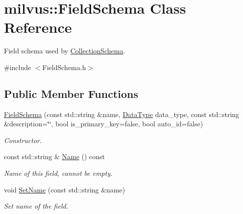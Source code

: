 \hypertarget{classmilvus_1_1_field_schema}{}\section{milvus\+:\+:Field\+Schema Class Reference}
\label{classmilvus_1_1_field_schema}


Field schema used by \hyperlink{classmilvus_1_1_collection_schema}{Collection\+Schema}.  




{\ttfamily \#include $<$Field\+Schema.\+h$>$}

\subsection*{Public Member Functions}
\begin{DoxyCompactItemize}
\item 
\mbox{\label{classmilvus_1_1_field_schema_ad626ad325c05abf8e8c020d1564c82aa}} 
\hyperlink{classmilvus_1_1_field_schema_ad626ad325c05abf8e8c020d1564c82aa}{Field\+Schema} (const std\+::string \&name, \hyperlink{namespacemilvus_a3bdf02cc09dcb59a1e1d2f287d90788b}{Data\+Type} data\+\_\+type, const std\+::string \&description=\char`\"{}\char`\"{}, bool is\+\_\+primary\+\_\+key=false, bool auto\+\_\+id=false)
\begin{DoxyCompactList}\small\item\em Constructor. \end{DoxyCompactList}\item 
\mbox{\label{classmilvus_1_1_field_schema_a8224147697c1416a8e80157224a9cc2a}} 
const std\+::string \& \hyperlink{classmilvus_1_1_field_schema_a8224147697c1416a8e80157224a9cc2a}{Name} () const
\begin{DoxyCompactList}\small\item\em Name of this field, cannot be empty. \end{DoxyCompactList}\item 
\mbox{\label{classmilvus_1_1_field_schema_a268b44271a055039710e3a50c87903bb}} 
void \hyperlink{classmilvus_1_1_field_schema_a268b44271a055039710e3a50c87903bb}{Set\+Name} (const std\+::string \&name)
\begin{DoxyCompactList}\small\item\em Set name of the field. \end{DoxyCompactList}\item 

\end{DoxyCompactItemize}
